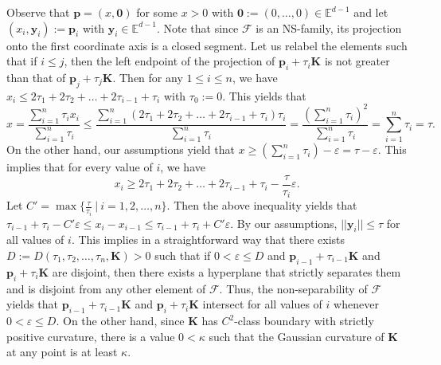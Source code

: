 \documentclass[12pt]{article}
\newcommand{\KK}{\mathbf K}
\newcommand{\Eu}{\mathbb{E}}
\newcommand{\p}{\mathbf{p}}
\begin{document}
Observe that $\p=(x, \mathbf{0})$ for some $x > 0$ with $\mathbf{0}:=(0, \dots , 0)\in \Eu^{d-1}$ and let $(x_i,\mathbf{y}_i):=\p_i$ with $\mathbf{y}_i\in  \Eu^{d-1}$. Note that since $\mathcal{F}$ is an NS-family, its projection onto the first coordinate axis is a closed segment. Let us relabel the elements such that if $i \leq j$, then the left endpoint of the projection of $\p_i + \tau_i \KK$ is not greater than that of $\p_j + \tau_j \KK$.
Then for any $1\leq i\leq n$, we have $x_i \leq 2 \tau_1 + 2\tau_2 + \ldots + 2 \tau_{i-1} + \tau_i$ with $\tau_0:=0$.
This yields that
\[
x = \frac{\sum_{i=1}^n \tau_i x_i}{ \sum_{i=1}^n \tau_i} \leq \frac{\sum_{i=1}^n (2 \tau_1 + 2\tau_2 + \ldots + 2 \tau_{i-1} + \tau_i) \tau_i}{ \sum_{i=1}^n \tau_i}
= \frac{(\sum_{i=1}^n \tau_i )^2}{\sum_{i=1}^n \tau_i} = \sum_{i=1}^n \tau_i =\tau.
\]
On the other hand, our assumptions yield that $x \geq \left(\sum_{i=1}^n \tau_i\right) - \varepsilon=\tau - \varepsilon$. This implies that for every value of $i$, we have
\[
x_i \geq 2 \tau_1 + 2\tau_2 + \ldots + 2 \tau_{i-1} + \tau_i - \frac{\tau}{\tau_i} \varepsilon.
\]
Let $C'= \max \{ \frac{\tau}{\tau_i} \ | \ i=1,2,\ldots, n\}$. Then the above inequality yields that $\tau_{i-1}+\tau_{i}- C'\varepsilon \leq x_i-x_{i-1} \leq \tau_{i-1}+\tau_i+C'\varepsilon$. By our assumptions, $||\mathbf{y}_i|| \leq \tau$ for all values of $i$. This implies in a straightforward way that there exists $D:=D(\tau_1,\tau_2,\ldots,\tau_n, \KK)>0$ such that if $0<\varepsilon \leq D$ and $\p_{i-1} + \tau_{i-1} \KK$ and $\p_{i} + \tau_{i} \KK$ are disjoint, then there exists a hyperplane that strictly separates them and is disjoint from any other element of $\mathcal{F}$. Thus, the non-separability of $\mathcal{F}$ yields that $\p_{i-1} + \tau_{i-1} \KK$ and $\p_{i} + \tau_{i} \KK$ intersect for all values of $i$ whenever $0<\varepsilon \leq D$. On the other hand, since $\KK$ has $C^2$-class boundary with strictly positive curvature, there is a value $0 < \kappa$ such that the Gaussian curvature of $\KK$ at any point is at least $\kappa$.
\end{document}
